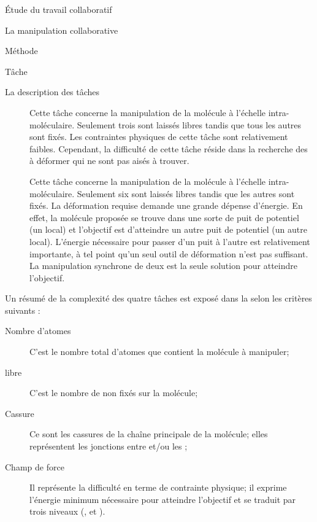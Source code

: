 \documentclass[myfrancais]{mythesis}
\begin{document}
\begin{mypart}{Étude du travail collaboratif}
\begin{mychapter}{La manipulation collaborative}
\begin{mysection}{Méthode}
\begin{mysubsection}{Tâche}
\begin{mysubsubsection}{La description des tâches}
\begin{description}
							\item[]
								Cette tâche concerne la manipulation de la molécule \myTRPZIPPER à l'échelle intra-moléculaire.
								Seulement trois  sont laissés libres tandis que tous les autres sont fixés.
								Les contraintes physiques de cette tâche sont relativement faibles.
								Cependant, la difficulté de cette tâche réside dans la recherche des  à déformer qui ne sont pas aisés à trouver.
							\item[]
								Cette tâche concerne la manipulation de la molécule \myTRPCAGE à l'échelle intra-moléculaire.
								Seulement six  sont laissés libres tandis que les autres sont fixés.
								La déformation requise demande une grande dépense d'énergie.
								En effet, la molécule proposée se trouve dans une sorte de puit de potentiel (un  local) et l'objectif est d'atteindre un autre puit de potentiel (un autre  local).
								L'énergie nécessaire pour passer d'un puit à l'autre est relativement importante, à tel point qu'un seul outil de déformation n'est pas suffisant.
								La manipulation synchrone de deux  est la seule solution pour atteindre l'objectif.
						\end{description}

						Un résumé de la complexité des quatre tâches est exposé dans la  selon les critères suivants :
						\begin{description}
							\item[Nombre d'atomes] C'est le nombre total d'atomes que contient la molécule à manipuler;
							\item[ libre] C'est le nombre de  non fixés sur la molécule;
							\item[Cassure] Ce sont les cassures de la chaîne principale de la molécule; elles représentent les jonctions entre \myhelice* et/ou les \myfeuillet*;
							\item[Champ de force] Il représente la difficulté en terme de contrainte physique; il exprime l'énergie minimum nécessaire pour atteindre l'objectif et se traduit par trois niveaux (,  et ).
						\end{description}


\end{mysubsubsection}
\end{mysubsection}
\end{mysection}
\end{mychapter}
\end{mypart}
\end{document}
